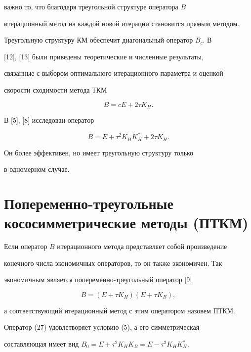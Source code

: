 важно то, что благодаря треугольной структуре оператора $B$ 


итерационный метод на каждой новой итерации становится прямым методом. 


 


Треугольную структуру КМ обеспечит диагональный оператор $B_c$. В 


[12], [13] были приведены теоретические и численные результаты, 


связанные с выбором оптимального итерационного параметра и оценкой 


скорости сходимости метода ТКМ 


$$ 


B=c E+2\tau K_H. 


$$ 


В [5], [8] исследован оператор 


$$ 


B=E+\tau^2K_H K^*_H+2\tau K_H. 


$$ 


Он более эффективен, но имеет треугольную структуру только 


в одномерном случае. 


 


\section{Попеременно-треугольные кососимметрические методы (ПТКМ)} 


 


Если оператор $B$ итерационного метода представляет собой произведение 


конечного числа экономичных операторов, то он также экономичен. Так 


экономичным является попеременно-треугольный оператор [9] 


\begin{equation} 


B=(E+\tau K_H)(E+\tau K_B), 


\end{equation} 


а соответствующий итерационный метод с этим оператором назовем ПТКМ. 


 


Оператор (27) удовлетворяет условию (5), а его симметрическая 


составляющая имеет вид $B_0=E+\tau^2K_H K_B=E-\tau^2K_H K^*_H$. 


